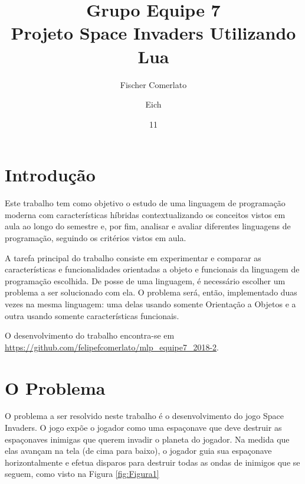 \documentclass[rel_mlp]{iiufrgs}
\title{Grupo Equipe 7 \\ Projeto Space Invaders Utilizando Lua}
\author{Fischer Comerlato}{Felipe} %
\author{Eich}{Leonardo} %
\date{11}{2018}
\begin{document}
\maketitle      


\tableofcontents








%
\chapter{Introdução} \label{intro}

Este trabalho tem como objetivo o estudo de uma linguagem de programação moderna com características híbridas contextualizando os conceitos vistos em aula ao longo do semestre e, por fim, analisar e avaliar diferentes linguagens de programação, seguindo os critérios vistos em aula.

A tarefa principal do trabalho consiste em experimentar e comparar as características e funcionalidades orientadas a objeto e funcionais da linguagem de programação escolhida. De posse de uma linguagem, é necessário escolher um problema a ser solucionado com ela. O problema será, então, implementado duas vezes na mesma linguagem: uma delas usando somente Orientação a Objetos e a outra usando somente características funcionais.

O desenvolvimento do trabalho encontra-se em \url{https://github.com/felipefcomerlato/mlp_equipe7_2018-2}.


\chapter{O Problema}
O problema a ser resolvido neste trabalho é o desenvolvimento do jogo Space Invaders. O jogo expõe o jogador como uma espaçonave que deve destruir as espaçonaves inimigas que querem invadir o planeta do jogador. Na medida que elas avançam na tela (de cima para baixo), o jogador guia sua espaçonave horizontalmente e efetua disparos para destruir todas as ondas de inimigos que se seguem, como visto na Figura \ref{fig:Figura1}
\end{document}

